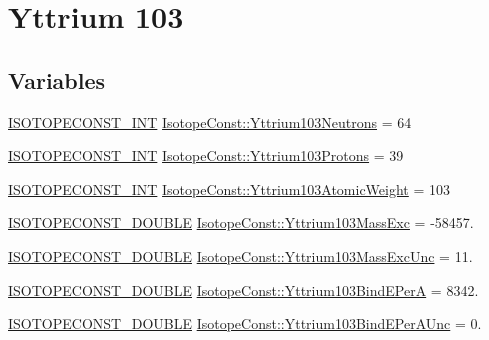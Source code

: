 \hypertarget{group___isotope_const-_yttrium-_y103}{}\section{Yttrium 103}
\label{group___isotope_const-_yttrium-_y103}
\subsection*{Variables}
\begin{DoxyCompactItemize}
\item 
\mbox{\hyperlink{group___isotope_const-_macros_ga5f18360b3e99483a35c32d789e62621c}{I\+S\+O\+T\+O\+P\+E\+C\+O\+N\+S\+T\+\_\+\+I\+NT}} \mbox{\hyperlink{group___isotope_const-_yttrium-_y103_ga378f0d037f5d8f61dd912f0a27eef17d}{Isotope\+Const\+::\+Yttrium103\+Neutrons}} = 64
\item 
\mbox{\hyperlink{group___isotope_const-_macros_ga5f18360b3e99483a35c32d789e62621c}{I\+S\+O\+T\+O\+P\+E\+C\+O\+N\+S\+T\+\_\+\+I\+NT}} \mbox{\hyperlink{group___isotope_const-_yttrium-_y103_gaff1ceffebcb69b86d9ccd34939bda33b}{Isotope\+Const\+::\+Yttrium103\+Protons}} = 39
\item 
\mbox{\hyperlink{group___isotope_const-_macros_ga5f18360b3e99483a35c32d789e62621c}{I\+S\+O\+T\+O\+P\+E\+C\+O\+N\+S\+T\+\_\+\+I\+NT}} \mbox{\hyperlink{group___isotope_const-_yttrium-_y103_ga030a89e53ae4991395090b4f9c7ba3b1}{Isotope\+Const\+::\+Yttrium103\+Atomic\+Weight}} = 103
\item 
\mbox{\hyperlink{group___isotope_const-_macros_ga8f45a7272ce02c0b4c65c44636ed719a}{I\+S\+O\+T\+O\+P\+E\+C\+O\+N\+S\+T\+\_\+\+D\+O\+U\+B\+LE}} \mbox{\hyperlink{group___isotope_const-_yttrium-_y103_ga3ed852973b96e9e61b5e816c987f01b6}{Isotope\+Const\+::\+Yttrium103\+Mass\+Exc}} = -\/58457.
\item 
\mbox{\hyperlink{group___isotope_const-_macros_ga8f45a7272ce02c0b4c65c44636ed719a}{I\+S\+O\+T\+O\+P\+E\+C\+O\+N\+S\+T\+\_\+\+D\+O\+U\+B\+LE}} \mbox{\hyperlink{group___isotope_const-_yttrium-_y103_ga9d6fc5202b241315889d994ba33297a3}{Isotope\+Const\+::\+Yttrium103\+Mass\+Exc\+Unc}} = 11.
\item 
\mbox{\hyperlink{group___isotope_const-_macros_ga8f45a7272ce02c0b4c65c44636ed719a}{I\+S\+O\+T\+O\+P\+E\+C\+O\+N\+S\+T\+\_\+\+D\+O\+U\+B\+LE}} \mbox{\hyperlink{group___isotope_const-_yttrium-_y103_ga39925c2236b156d105c7fc092bc02959}{Isotope\+Const\+::\+Yttrium103\+Bind\+E\+PerA}} = 8342.
\item 
\mbox{\hyperlink{group___isotope_const-_macros_ga8f45a7272ce02c0b4c65c44636ed719a}{I\+S\+O\+T\+O\+P\+E\+C\+O\+N\+S\+T\+\_\+\+D\+O\+U\+B\+LE}} \mbox{\hyperlink{group___isotope_const-_yttrium-_y103_gabb2a24b8d00206546a6da4e8a55fd47a}{Isotope\+Const\+::\+Yttrium103\+Bind\+E\+Per\+A\+Unc}} = 0.

\end{DoxyCompactItemize}
